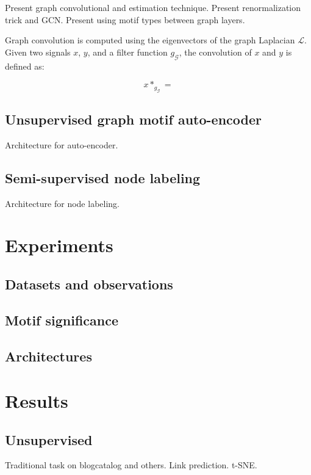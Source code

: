 \documentclass{article}
\theoremstyle{definition}
\begin{document}
Present graph convolutional and estimation technique.
Present renormalization trick and GCN.
Present using motif types between graph layers.

Graph convolution is computed using the eigenvectors of
the graph Laplacian $\mathcal{L}$. Given two signals 
$x$, $y$, and a filter function $g_\mathcal{G}$, the 
convolution of $x$ and $y$ is defined as:

$$ x *_{g_\mathcal{G}} = $$

\subsection{Unsupervised graph motif auto-encoder}

Architecture for auto-encoder.

\subsection{Semi-supervised node labeling}

Architecture for node labeling.

\section{Experiments}

\subsection{Datasets and observations}

\subsection{Motif significance}

\subsection{Architectures}

\section{Results}

\subsection{Unsupervised}

Traditional task on blogcatalog and others.
Link prediction.
t-SNE.
\end{document}
